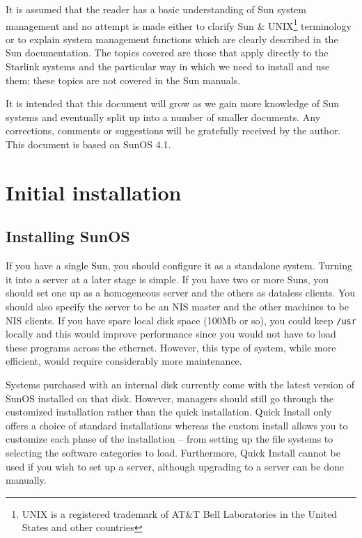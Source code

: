 It is assumed that the reader has a basic understanding of Sun system
management and no attempt is made either to clarify Sun \& 
UNIX\footnote{UNIX is a registered trademark of AT\&T Bell Laboratories in the
United States and other countries} terminology 
or to explain system management functions which are clearly described in
the Sun documentation. The topics covered are those that apply directly to 
the Starlink systems and the particular way in which we need to install
and use them; these topics are not covered in the Sun manuals.

It is intended that this document will grow as we gain more knowledge
of Sun systems and eventually split up into a number of smaller documents.
Any corrections, comments or suggestions will be gratefully received by the
author. This document is based on SunOS 4.1.


\section{Initial installation}

\subsection{Installing SunOS}

If you have a single Sun, you should configure it as a standalone
system. Turning it into a server at a later stage is simple.
If you have two or more Suns, you should set one up as a homogeneous server
and the others as dataless clients. You should also specify the
server to be an NIS master and the other machines to be NIS clients.
If you have spare local disk space (100Mb or so), you could keep
{\tt /usr} locally and this would improve performance since you would
not have to load these programs across the ethernet. However, this 
type of system, while more efficient, would require considerably more
maintenance.

Systems purchased with an internal disk currently come with the latest
version of SunOS installed on that disk. However, managers should still
go through the customized installation rather than the quick installation.
Quick Install only offers a choice of standard installations whereas
the custom install allows you to customize each phase of the installation -- 
from setting up the file systems to selecting the software categories to 
load. Furthermore, Quick Install cannot be used if you wish to set up a
server, although upgrading to a server can be done manually.

